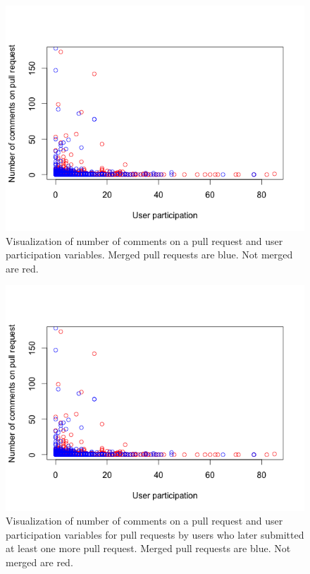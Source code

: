 \documentclass[12pt]{article}
\begin{document}
\begin{figure}[p] \centering
\caption{Visualization of number of comments on a pull request and user
participation variables. Merged pull requests are blue. Not merged are red.}
\label{social_plot}
\includegraphics[scale=0.75]{figures/social_variables.png}
\end{figure}

\begin{figure}[p] \centering
\caption{Visualization of number of comments on a pull request and user
participation variables for pull requests by users who later submitted at least
one more pull request. Merged pull requests are blue. Not merged are red.}
\label{social_plot_repeaters}
\includegraphics[scale=0.75]{figures/social_variables.png}
\end{figure}
\end{document}
